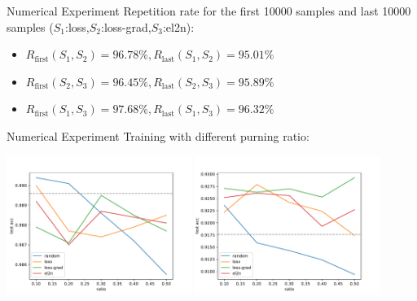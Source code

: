 \documentclass{ctexbeamer}
\begin{document}
\begin{frame}{Numerical Experiment}
    Repetition rate for the first 10000 samples and last 10000 samples (\(S_1\):loss,\(S_2\):loss-grad,\(S_3\):el2n):
    \begin{itemize}
        \item \(R_{\text{first} }(S_1,S_2)=96.78\%,R_{\text{last} }(S_1,S_2)=95.01\%\)
        \item \(R_{\text{first} }(S_2,S_3)=96.45\%,R_{\text{last} }(S_2,S_3)=95.89\%\)
        \item \(R_{\text{first} }(S_1,S_3)=97.68\%,R_{\text{last} }(S_1,S_3)=96.32\%\)
    \end{itemize}
\end{frame}

\begin{frame}{Numerical Experiment}
    Training with different purning ratio:
    \begin{center}
        \includegraphics[width=0.45\textwidth]{../images/mnist_ratio.pdf}
        \includegraphics[width=0.45\textwidth]{../images/cifar10_ratio.pdf}
    \end{center}
\end{frame}
\end{document}

